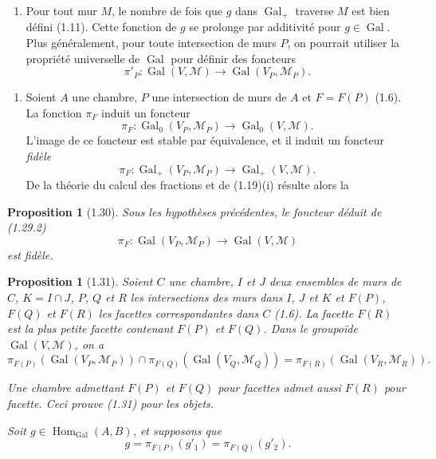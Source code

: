 \documentclass[12pt]{article}
\newtheorem{proposition}[theoreme]{Proposition}
\theoremstyle{remark}
\DeclareMathOperator{\Gal}{Gal}
\DeclareMathOperator{\Hom}{Hom}
\begin{document}
\begin{enumerate}
\item[(1.28)] Pour tout mur $M$, le nombre de fois que $g$ dans $\Gal_+$ traverse $M$ est bien défini (1.11). Cette fonction de $g$ se prolonge par additivité pour $g \in \Gal$. Plus généralement, pour toute intersection de murs $P$, on pourrait utiliser la propriété universelle de $\Gal$ pour définir des foncteurs
\[\pi'_P \colon \Gal(V, \mathcal{M}) \to \Gal(V_P, \mathcal{M}_P).\]
\end{enumerate}

\begin{enumerate}
\item[(1.29)] Soient $A$ une chambre, $P$ une intersection de murs de $A$ et $F = F(P)$ (1.6). La fonction $\pi_F$ induit un foncteur
\begin{equation}
\pi_F \colon \Gal_0(V_P, \mathcal{M}_P) \to \Gal_0(V, \mathcal{M}).\tag{1.29.1}
\end{equation}
L'image de ce foncteur est stable par équivalence, et il induit un foncteur \emph{fidèle}
\begin{equation}
\pi_F \colon \Gal_+(V_P, \mathcal{M}_P) \to \Gal_+(V, \mathcal{M}).\tag{1.29.2}
\end{equation}
De la théorie du calcul des fractions et de (1.19)(i) résulte alors la
\end{enumerate}

\begin{proposition}[1.30]
Sous les hypothèses précédentes, le foncteur déduit de (1.29.2)
\[\pi_F \colon \Gal(V_P, \mathcal{M}_P) \to \Gal(V, \mathcal{M})\]
est fidèle.
\end{proposition}

\begin{proposition}[1.31]
Soient $C$ une chambre, $I$ et $J$ deux ensembles de murs de $C$, $K = I \cap J$, $P$, $Q$ et $R$ les intersections des murs dans $I$, $J$ et $K$ et $F(P)$, $F(Q)$ et $F(R)$ les facettes correspondantes dans $C$ (1.6). La facette $F(R)$ est la plus petite facette contenant $F(P)$ et $F(Q)$. Dans le groupoïde $\Gal(V, \mathcal{M})$, on a
\[\pi_{F(P)}(\Gal(V_P, \mathcal{M}_P)) \cap \pi_{F(Q)}(\Gal(V_Q, \mathcal{M}_Q)) = \pi_{F(R)}(\Gal(V_R, \mathcal{M}_R)).\]

Une chambre admettant $F(P)$ et $F(Q)$ pour facettes admet aussi $F(R)$ pour facette. Ceci prouve (1.31) pour les objets.

Soit $g \in \Hom_{\Gal}(A, B)$, et supposons que
\[g = \pi_{F(P)}(g'_1) = \pi_{F(Q)}(g'_2).\]
\end{proposition}
\end{document}
